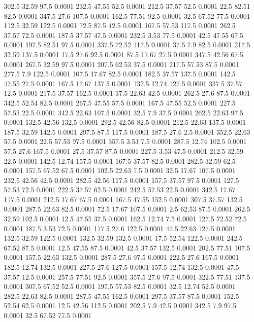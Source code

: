 302.5	32.59	97.5	0.0001
232.5	47.55	52.5	0.0001
212.5	37.57	52.5	0.0001
22.5	82.51	82.5	0.0001
347.5	27.6	107.5	0.0001
162.5	77.51	92.5	0.0001
32.5	67.52	77.5	0.0001
112.5	32.59	122.5	0.0001
72.5	87.5	42.5	0.0001
167.5	57.53	117.5	0.0001
262.5	37.57	72.5	0.0001
187.5	37.57	47.5	0.0001
232.5	3.53	77.5	0.0001
42.5	47.55	67.5	0.0001
197.5	82.51	97.5	0.0001
337.5	72.52	117.5	0.0001
37.5	7.9	82.5	0.0001
217.5	32.59	137.5	0.0001
17.5	27.6	92.5	0.0001
87.5	17.67	27.5	0.0001
347.5	42.56	67.5	0.0001
267.5	32.59	97.5	0.0001
207.5	62.53	37.5	0.0001
217.5	57.53	87.5	0.0001
277.5	7.9	122.5	0.0001
107.5	17.67	82.5	0.0001
182.5	37.57	137.5	0.0001
142.5	47.55	27.5	0.0001
167.5	17.67	137.5	0.0001
132.5	12.74	127.5	0.0001
337.5	37.57	12.5	0.0001
217.5	37.57	162.5	0.0001
37.5	22.63	42.5	0.0001
262.5	27.6	87.5	0.0001
342.5	52.54	82.5	0.0001
267.5	47.55	57.5	0.0001
167.5	47.55	52.5	0.0001
227.5	57.53	22.5	0.0001
342.5	22.63	107.5	0.0001
32.5	7.9	37.5	0.0001
262.5	22.63	97.5	0.0001
132.5	42.56	132.5	0.0001
292.5	42.56	82.5	0.0001
212.5	22.63	137.5	0.0001
187.5	32.59	142.5	0.0001
297.5	87.5	117.5	0.0001
187.5	27.6	2.5	0.0001
352.5	22.63	57.5	0.0001
22.5	57.53	97.5	0.0001
357.5	3.53	7.5	0.0001
287.5	12.74	102.5	0.0001
57.5	27.6	167.5	0.0001
27.5	37.57	87.5	0.0001
227.5	3.53	47.5	0.0001
212.5	32.59	22.5	0.0001
142.5	12.74	157.5	0.0001
167.5	37.57	82.5	0.0001
282.5	32.59	62.5	0.0001
157.5	67.52	67.5	0.0001
102.5	22.63	7.5	0.0001
32.5	17.67	107.5	0.0001
232.5	42.56	42.5	0.0001
282.5	42.56	117.5	0.0001
157.5	37.57	97.5	0.0001
127.5	57.53	72.5	0.0001
222.5	37.57	62.5	0.0001
242.5	57.53	22.5	0.0001
342.5	17.67	117.5	0.0001
212.5	17.67	67.5	0.0001
167.5	47.55	152.5	0.0001
307.5	37.57	132.5	0.0001
287.5	22.63	82.5	0.0001
72.5	17.67	107.5	0.0001
2.5	62.53	87.5	0.0001
262.5	32.59	102.5	0.0001
12.5	47.55	37.5	0.0001
162.5	12.74	7.5	0.0001
127.5	72.52	72.5	0.0001
187.5	3.53	72.5	0.0001
117.5	27.6	122.5	0.0001
47.5	22.63	127.5	0.0001
132.5	32.59	122.5	0.0001
132.5	32.59	132.5	0.0001
17.5	52.54	122.5	0.0001
242.5	67.52	87.5	0.0001
12.5	47.55	87.5	0.0001
42.5	37.57	132.5	0.0001
202.5	77.51	107.5	0.0001
157.5	22.63	132.5	0.0001
287.5	27.6	97.5	0.0001
222.5	27.6	167.5	0.0001
182.5	12.74	132.5	0.0001
227.5	27.6	127.5	0.0001
157.5	12.74	132.5	0.0001
47.5	37.57	12.5	0.0001
257.5	77.51	92.5	0.0001
357.5	27.6	97.5	0.0001
322.5	77.51	137.5	0.0001
307.5	67.52	52.5	0.0001
197.5	57.53	82.5	0.0001
32.5	12.74	52.5	0.0001
282.5	22.63	82.5	0.0001
287.5	47.55	162.5	0.0001
297.5	37.57	87.5	0.0001
152.5	52.54	62.5	0.0001
12.5	42.56	112.5	0.0001
202.5	7.9	42.5	0.0001
342.5	7.9	97.5	0.0001
32.5	67.52	77.5	0.0001
